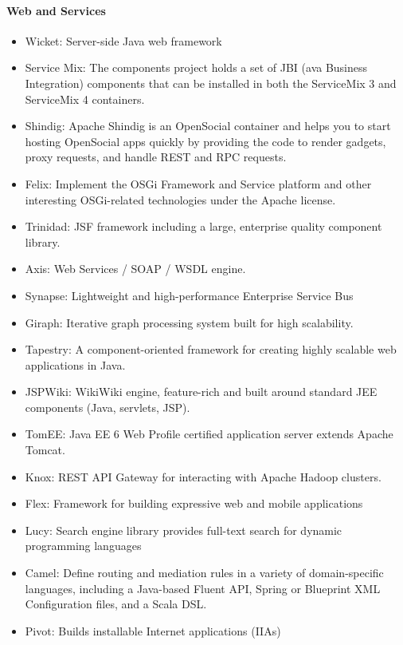 \documentclass[natbib]{svjour3}
\providecommand{\tightlist}{%
  \setlength{\itemsep}{0pt}\setlength{\parskip}{0pt}}
\let\oldparagraph\paragraph
\renewcommand{\paragraph}[1]{\oldparagraph{#1}\mbox{}}
\begin{document}
\paragraph{Web and Services}\label{web-and-services}

\begin{itemize}
\tightlist
\item
  Wicket: Server-side Java web framework
\item
  Service Mix: The components project holds a set of JBI (ava Business
  Integration) components that can be installed in both the ServiceMix 3
  and ServiceMix 4 containers.
\item
  Shindig: Apache Shindig is an OpenSocial container and helps you to
  start hosting OpenSocial apps quickly by providing the code to render
  gadgets, proxy requests, and handle REST and RPC requests.
\item
  Felix: Implement the OSGi Framework and Service platform and other
  interesting OSGi-related technologies under the Apache license.
\item
  Trinidad: JSF framework including a large, enterprise quality
  component library.
\item
  Axis: Web Services / SOAP / WSDL engine.
\item
  Synapse: Lightweight and high-performance Enterprise Service Bus
\item
  Giraph: Iterative graph processing system built for high scalability.
\item
  Tapestry: A component-oriented framework for creating highly scalable
  web applications in Java.
\item
  JSPWiki: WikiWiki engine, feature-rich and built around standard JEE
  components (Java, servlets, JSP).
\item
  TomEE: Java EE 6 Web Profile certified application server extends
  Apache Tomcat.
\item
  Knox: REST API Gateway for interacting with Apache Hadoop clusters.
\item
  Flex: Framework for building expressive web and mobile applications
\item
  Lucy: Search engine library provides full-text search for dynamic
  programming languages
\item
  Camel: Define routing and mediation rules in a variety of
  domain-specific languages, including a Java-based Fluent API, Spring
  or Blueprint XML Configuration files, and a Scala DSL.
\item
  Pivot: Builds installable Internet applications (IIAs)

\end{itemize}
\end{document}

